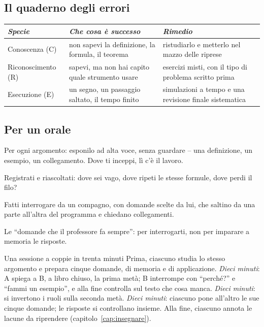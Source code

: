 \subsection*{Il quaderno degli errori}

\begin{center}\small
  \begin{tabular}{@{}>{\raggedright\arraybackslash}p{}>{\raggedright\arraybackslash}p{}>{\raggedright\arraybackslash}p{}@{}}
    \toprule
    \textit{Specie} & \textit{Che cosa è successo} & \textit{Rimedio} \\
    \midrule
    Conoscenza (C) & non sapevi la definizione, la formula, il teorema &
      ristudiarlo e metterlo nel mazzo delle riprese \\
    \addlinespace
    Riconoscimento (R) & sapevi, ma non hai capito quale strumento usare &
      esercizi misti, con il tipo di problema scritto prima \\
    \addlinespace
    Esecuzione (E) & un segno, un passaggio saltato, il tempo finito &
      simulazioni a tempo e una revisione finale sistematica \\
    \bottomrule
  \end{tabular}
\end{center}

\subsection*{Per un orale}

\begin{controlli}
  \item Per ogni argomento: esponilo ad alta voce, senza guardare --
        una definizione, un esempio, un collegamento. Dove ti inceppi,
        lì c'è il lavoro.
  \item Registrati e riascoltati: dove sei vago, dove ripeti le stesse
        formule, dove perdi il filo?
  \item Fatti interrogare da un compagno, con domande scelte da lui, che
        saltino da una parte all'altra del programma e chiedano
        collegamenti.
  \item Le \enquote{domande che il professore fa sempre}: per
        interrogarti, non per imparare a memoria le risposte.
\end{controlli}

\begin{riquadro}{Una sessione a coppie in trenta minuti}
Prima, ciascuno studia lo stesso argomento e prepara cinque domande,
di memoria e di applicazione. \emph{Dieci minuti}: A spiega a B, a
libro chiuso, la prima metà; B interrompe con \enquote{perché?} e
\enquote{fammi un esempio}, e alla fine controlla sul testo che cosa
manca. \emph{Dieci minuti}: si invertono i ruoli sulla seconda metà.
\emph{Dieci minuti}: ciascuno pone all'altro le sue cinque domande; le
risposte si controllano insieme. Alla fine, ciascuno annota le lacune
da riprendere (capitolo~\ref{cap:insegnare}).
\end{riquadro}

